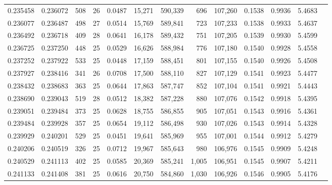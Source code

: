 \begin{tabular}{rrrrrrrrrrrrr}
0.235458 & 0.236072 & 508 &  26 &                                     0.0487 &  15,271 & 590,339 &     696 & 107,260 & 0.1538 & 0.9936 & 5.4683 \\
0.236077 & 0.236487 & 498 &  27 &                                     0.0514 &  15,769 & 589,841 &     723 & 107,233 & 0.1538 & 0.9933 & 5.4637 \\
0.236492 & 0.236718 & 409 &  28 &                                     0.0641 &  16,178 & 589,432 &     751 & 107,205 & 0.1539 & 0.9930 & 5.4599 \\
0.236725 & 0.237250 & 448 &  25 &                                     0.0529 &  16,626 & 588,984 &     776 & 107,180 & 0.1540 & 0.9928 & 5.4558 \\
0.237252 & 0.237922 & 533 &  25 &                                     0.0448 &  17,159 & 588,451 &     801 & 107,155 & 0.1540 & 0.9926 & 5.4508 \\
0.237927 & 0.238416 & 341 &  26 &                                     0.0708 &  17,500 & 588,110 &     827 & 107,129 & 0.1541 & 0.9923 & 5.4477 \\
0.238432 & 0.238683 & 363 &  25 &                                     0.0644 &  17,863 & 587,747 &     852 & 107,104 & 0.1541 & 0.9921 & 5.4443 \\
0.238690 & 0.239043 & 519 &  28 &                                     0.0512 &  18,382 & 587,228 &     880 & 107,076 & 0.1542 & 0.9918 & 5.4395 \\
0.239051 & 0.239484 & 373 &  25 &                                     0.0628 &  18,755 & 586,855 &     905 & 107,051 & 0.1543 & 0.9916 & 5.4361 \\
0.239484 & 0.239928 & 357 &  25 &                                     0.0654 &  19,112 & 586,498 &     930 & 107,026 & 0.1543 & 0.9914 & 5.4328 \\
0.239929 & 0.240201 & 529 &  25 &                                     0.0451 &  19,641 & 585,969 &     955 & 107,001 & 0.1544 & 0.9912 & 5.4279 \\
0.240206 & 0.240519 & 326 &  25 &                                     0.0712 &  19,967 & 585,643 &     980 & 106,976 & 0.1545 & 0.9909 & 5.4248 \\
0.240529 & 0.241113 & 402 &  25 &                                     0.0585 &  20,369 & 585,241 &   1,005 & 106,951 & 0.1545 & 0.9907 & 5.4211 \\
0.241133 & 0.241408 & 381 &  25 &                                     0.0616 &  20,750 & 584,860 &   1,030 & 106,926 & 0.1546 & 0.9905 & 5.4176 \\

\end{tabular}
